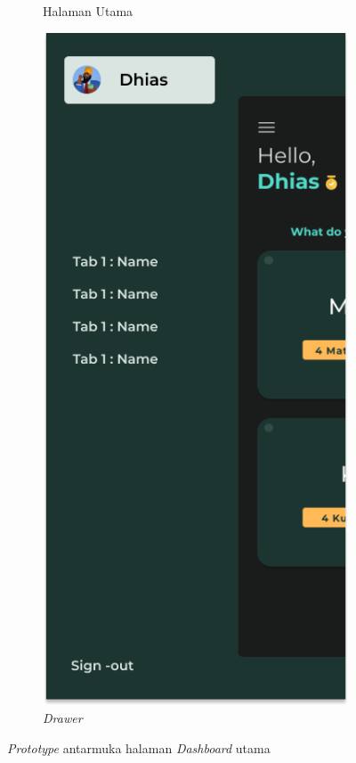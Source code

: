 \begin{figure}[H]
\begin{subfigure}[b]{0.23\textwidth}
	  \caption{Halaman Utama}
	  \label{fig:HasilMainDash-dark}
	\end{subfigure}
    \begin{subfigure}[b]{0.23\textwidth}
		\centering
	  \includegraphics[width=\linewidth]{contents/chapter-3/images/HF-Drawer-dt.png}
	  \caption{\textit{Drawer}}
	  \label{fig:HasilMainDash2-dark}
	\end{subfigure}
	\caption{\textit{Prototype} antarmuka halaman \textit{Dashboard} utama}
	\label{Fig:HasilFeatureDashboard}
\end{figure}
